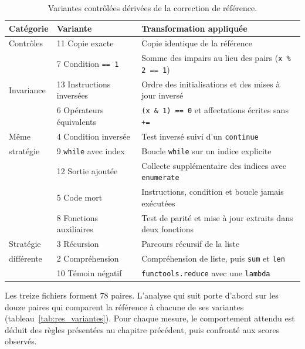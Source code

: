 \documentclass[12pt,a4paper,oneside]{report}
\begin{document}
\begin{table}[htbp]
\centering
\small
\renewcommand{\arraystretch}{1.15}
\begin{tabularx}{\textwidth}{llX}
\toprule
\textbf{Catégorie} & \textbf{Variante} & \textbf{Transformation appliquée} \\
\midrule
Contrôles  & 11 Copie exacte & Copie identique de la référence \\
           & 7 Condition \texttt{== 1} & Somme des impairs au lieu des pairs (\texttt{x \% 2 == 1}) \\
\midrule
Invariance & 13 Instructions inversées & Ordre des initialisations et des mises à jour inversé \\
           & 6 Opérateurs équivalents & \texttt{(x \& 1) == 0} et affectations écrites sans \texttt{+=} \\
\midrule
Même       & 4 Condition inversée & Test inversé suivi d'un \texttt{continue} \\
stratégie  & 9 \texttt{while} avec index & Boucle \texttt{while} sur un indice explicite \\
           & 12 Sortie ajoutée & Collecte supplémentaire des indices avec \texttt{enumerate} \\
           & 5 Code mort & Instructions, condition et boucle jamais exécutées \\
           & 8 Fonctions auxiliaires & Test de parité et mise à jour extraits dans deux fonctions \\
\midrule
Stratégie  & 3 Récursion & Parcours récursif de la liste \\
différente & 2 Compréhension & Compréhension de liste, puis \texttt{sum} et \texttt{len} \\
           & 10 Témoin négatif & \texttt{functools.reduce} avec une \texttt{lambda} \\
\bottomrule
\end{tabularx}
\caption{Variantes contrôlées dérivées de la correction de référence.}
\label{tab:desc_variantes}
\end{table}

Les treize fichiers forment 78 paires. L'analyse qui suit porte d'abord sur
les douze paires qui comparent la référence à chacune de ses variantes
(tableau~\ref{tab:res_variantes}). Pour chaque mesure, le comportement attendu
est déduit des règles présentées au chapitre précédent, puis confronté aux
scores observés.
\end{document}

